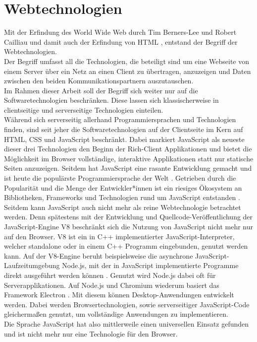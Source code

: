 \section{Webtechnologien}
\label{sec:webtechnologien}

Mit der Erfindung des World Wide Web durch Tim Berners-Lee und Robert Cailliau und damit auch der Erfindung 
von HTML \cite{www}, entstand der Begriff der Webtechnologien.\\
Der Begriff umfasst all die Technologien, die beteiligt sind um eine Webseite von einem Server über ein Netz 
an einen Client zu übertragen, anzuzeigen und Daten zwischen den beiden Kommunikationspartnern auszutauschen.\\

Im Rahmen dieser Arbeit soll der Begriff sich weiter nur auf die Softwaretechnologien beschränken. 
Diese lassen sich klassischerweise in clientseitige und serverseitige Technologien einteilen.\\
Während sich serverseitig allerhand Programmiersprachen und Technologien finden, sind seit jeher die Softwaretechnologien
auf der Clientseite im Kern auf HTML, CSS und JavaScript beschränkt. Dabei markiert JavaScript als neueste dieser
drei Technologien \cite{jspress} den Beginn der Rich-Client Applikationen und bietet die Möglichkeit im Browser 
vollständige, interaktive Applikationen statt nur statische Seiten anzuzeigen. Seitdem hat JavaScript eine rasante 
Entwicklung gemacht und ist heute die populärste Programmiersprache der Welt \cite{npmstat}. Getrieben durch 
die Popularität und die Menge der Entwickler*innen ist ein riesiges Ökosystem an Bibliotheken, Frameworks
und Technologien rund um JavaScript entstanden \cite{npmstat}. Seitdem kann JavaScript auch nicht mehr als reine Webtechnologie
betrachtet werden.
Denn spätestens mit der Entwicklung und Quellcode-Veröffentlichung der JavaScript-Engine V8 \cite{v8} beschränkt 
sich die Nutzung von JavaScript nicht mehr nur auf den Browser. V8 ist ein in C++ implementierter JavaScript-Interpreter, 
welcher standalone oder in einem C++ Programm eingebunden, genutzt werden kann. Auf der V8-Engine beruht beispielsweise 
die asynchrone JavaScript-Laufzeitumgebung Node.js, mit der in JavaScript implementierte Programme direkt ausgeführt 
werden können \cite{node}. Genutzt wird Node.js dabei oft für Serverapplikationen.
Auf Node.js und Chromium wiederum basiert das Framework Electron \cite{electron}. Mit diesem können Desktop-Anwendungen
entwickelt werden. Dabei werden Browsertechnologien, sowie serverseitiger JavaScript-Code gleichermaßen
genutzt, um vollständige Anwendungen zu implementieren.\\
Die Sprache JavaScript hat also mittlerweile einen universellen Einsatz gefunden 
und ist nicht mehr nur eine Technologie für den Browser.\\

